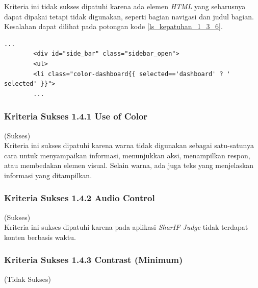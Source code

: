 \documentclass[a4paper,twoside]{article}
\begin{document}
\begin{enumerate}
		Kriteria ini tidak sukses dipatuhi karena ada elemen \textit{HTML} yang seharusnya dapat dipakai tetapi tidak digunakan, seperti bagian navigasi dan judul bagian. Kesalahan dapat dilihat pada potongan kode \ref{ls_kepatuhan_1_3_6}.
		\begin{lstlisting}[basicstyle=\ttfamily, frame=single,
		columns=fullflexible, keepspaces=true, breaklines=true, label=ls_kepatuhan_1_3_6, caption=Kriteria Sukses 1.3.6 - \textit{Sidebar}]
		...
		<div id="side_bar" class="sidebar_open">
		<ul>
		<li class="color-dashboard{{ selected=='dashboard' ? ' selected' }}">
		...
		\end{lstlisting}
		
		\subsubsection*{Kriteria Sukses 1.4.1 Use of Color}
		\label{subsubsec:kepatuhan_kriteria_1.4.1}
		(Sukses) \\
		
		Kriteria ini sukses dipatuhi karena warna tidak digunakan sebagai satu-satunya cara untuk menyampaikan informasi, menunjukkan aksi, menampilkan respon, atau membedakan elemen visual. Selain warna, ada juga teks yang menjelaskan informasi yang ditampilkan.
		
		\subsubsection*{Kriteria Sukses 1.4.2 Audio Control}
		\label{subsubsec:kepatuhan_kriteria_1.4.2}
		(Sukses) \\
		
		Kriteria ini sukses dipatuhi karena pada aplikasi \textit{SharIF Judge} tidak terdapat konten berbasis waktu.
		
		\subsubsection*{Kriteria Sukses 1.4.3 Contrast (Minimum)}
		\label{subsubsec:kepatuhan_kriteria_1.4.3}
		(Tidak Sukses) \\
		

\end{enumerate}
\end{document}
